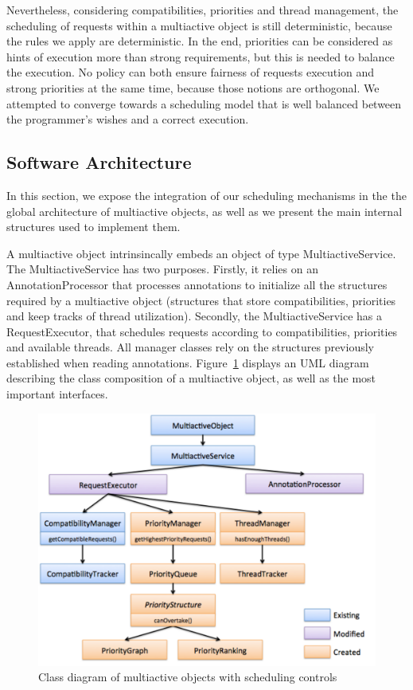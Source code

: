 \documentclass[11pt]{report}
\begin{document}
Nevertheless, considering compatibilities, priorities and thread management, the scheduling of requests within a multiactive object is still deterministic, because the rules we apply are deterministic. In the end, priorities can be considered as hints of execution more than strong requirements, but this is needed to balance the execution. No policy can both ensure fairness of requests execution and strong priorities at the same time, because those notions are orthogonal. We attempted to converge towards a scheduling model that is well balanced between the programmer's wishes and a correct execution.


\subsection{Software Architecture}
In this section, we expose the integration of our scheduling mechanisms in the  the global architecture of multiactive objects, as well as we present the main internal structures used to implement them.

A multiactive object intrinsincally embeds an object of type MultiactiveService. The MultiactiveService has two purposes. Firstly, it relies on an AnnotationProcessor that processes annotations to initialize all the structures required by a multiactive object (structures that store compatibilities, priorities and keep tracks of thread utilization). Secondly, the MultiactiveService has a RequestExecutor, that schedules requests according to compatibilities, priorities and available threads. All manager classes rely on the structures previously established when reading annotations. Figure~\ref{fig:uml} displays an UML diagram describing the class composition of a multiactive object, as well as the most important interfaces.

\begin{figure}[!ht]
      \begin{minipage}[c]{\textwidth}
      \centering
      \includegraphics[scale=0.5]{pictures/uml.pdf}
      \end{minipage}
      \caption{Class diagram of multiactive objects with scheduling controls}
      \label{fig:uml} 
\end{figure}
\end{document}
